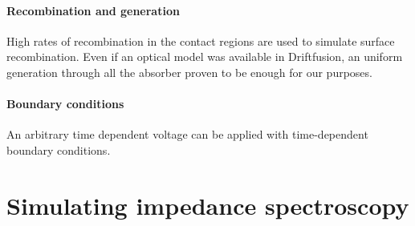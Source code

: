 	\paragraph{Recombination and generation}
	High rates of recombination in the contact regions are used to simulate surface recombination.
	Even if an optical model was available in Driftfusion, an uniform generation through all the absorber proven to be enough for our purposes.

	\paragraph{Boundary conditions}
	An arbitrary time dependent voltage can be applied with time\hyp{}dependent boundary conditions.




\section{Simulating impedance spectroscopy}


